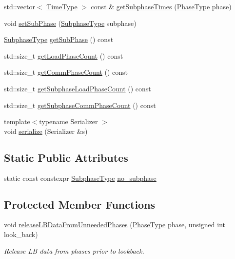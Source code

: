 \begin{DoxyCompactItemize}
std\+::vector$<$ \hyperlink{namespacevt_a876a9d0cd5a952859c72de8a46881442}{Time\+Type} $>$ const  \& \hyperlink{structvt_1_1elm_1_1_element_l_b_data_a9d1dd5210bfe33d555d729b9c3486d46}{get\+Subphase\+Times} (\hyperlink{namespacevt_a46ce6733d5cdbd735d561b7b4029f6d7}{Phase\+Type} phase)
\item 
void \hyperlink{structvt_1_1elm_1_1_element_l_b_data_a93c02f4370d1622fefe6a63f0f360d96}{set\+Sub\+Phase} (\hyperlink{namespacevt_ae78cbfdf1e57470e33eedb074f2beeba}{Subphase\+Type} subphase)
\item 
\hyperlink{namespacevt_ae78cbfdf1e57470e33eedb074f2beeba}{Subphase\+Type} \hyperlink{structvt_1_1elm_1_1_element_l_b_data_a00c4afedbaa4b2cbebf877ea194297c3}{get\+Sub\+Phase} () const
\item 
std\+::size\+\_\+t \hyperlink{structvt_1_1elm_1_1_element_l_b_data_a2caf9adf8c33a1d2dda021388b84bb00}{get\+Load\+Phase\+Count} () const
\item 
std\+::size\+\_\+t \hyperlink{structvt_1_1elm_1_1_element_l_b_data_a5164aaf6b9aa619465454b7d24273f10}{get\+Comm\+Phase\+Count} () const
\item 
std\+::size\+\_\+t \hyperlink{structvt_1_1elm_1_1_element_l_b_data_ab8778cab537f8428281088d47c18eebc}{get\+Subphase\+Load\+Phase\+Count} () const
\item 
std\+::size\+\_\+t \hyperlink{structvt_1_1elm_1_1_element_l_b_data_ae042437f8dcaff5822b670b73b4e724b}{get\+Subphase\+Comm\+Phase\+Count} () const
\item 
{\footnotesize template$<$typename Serializer $>$ }\\void \hyperlink{structvt_1_1elm_1_1_element_l_b_data_a621cfc47dbcd0505e25d9060a78f080f}{serialize} (Serializer \&s)
\end{DoxyCompactItemize}
\subsection*{Static Public Attributes}
\begin{DoxyCompactItemize}
\item 
static const constexpr \hyperlink{namespacevt_ae78cbfdf1e57470e33eedb074f2beeba}{Subphase\+Type} \hyperlink{structvt_1_1elm_1_1_element_l_b_data_af93ba399701c539f3acbe75095e0d080}{no\+\_\+subphase}
\end{DoxyCompactItemize}
\subsection*{Protected Member Functions}
\begin{DoxyCompactItemize}
\item 
void \hyperlink{structvt_1_1elm_1_1_element_l_b_data_ad74e3a2d52dc65533df25846211c9aa4}{release\+L\+B\+Data\+From\+Unneeded\+Phases} (\hyperlink{namespacevt_a46ce6733d5cdbd735d561b7b4029f6d7}{Phase\+Type} phase, unsigned int look\+\_\+back)
\begin{DoxyCompactList}\small\item\em Release LB data from phases prior to lookback. \end{DoxyCompactList}\end{DoxyCompactItemize}
